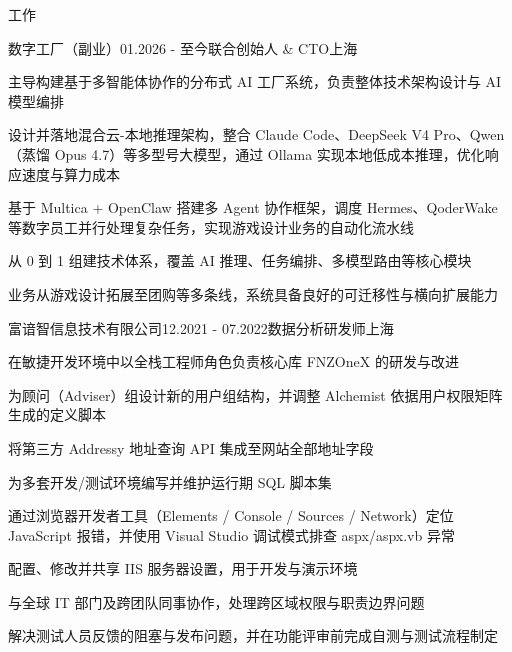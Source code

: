 \documentclass{resume} %
\begin{document}
\begin{rSection}{工作}
  \begin{rSubsection}{数字工厂（副业）}{01.2026 - 至今}{联合创始人 \& CTO}{上海}
    \item 主导构建基于多智能体协作的分布式 AI 工厂系统，负责整体技术架构设计与 AI 模型编排
    \item 设计并落地混合云-本地推理架构，整合 Claude Code、DeepSeek V4 Pro、Qwen（蒸馏 Opus 4.7）等多型号大模型，通过 Ollama 实现本地低成本推理，优化响应速度与算力成本
    \item 基于 Multica + OpenClaw 搭建多 Agent 协作框架，调度 Hermes、QoderWake 等数字员工并行处理复杂任务，实现游戏设计业务的自动化流水线
    \item 从 0 到 1 组建技术体系，覆盖 AI 推理、任务编排、多模型路由等核心模块
    \item 业务从游戏设计拓展至团购等多条线，系统具备良好的可迁移性与横向扩展能力
  \end{rSubsection}

  \begin{rSubsection}{富谙智信息技术有限公司}{12.2021 - 07.2022}{数据分析研发师}{上海}
    \item 在敏捷开发环境中以全栈工程师角色负责核心库 FNZOneX 的研发与改进
    \item 为顾问（Adviser）组设计新的用户组结构，并调整 Alchemist 依据用户权限矩阵生成的定义脚本
    \item 将第三方 Addressy 地址查询 API 集成至网站全部地址字段
    \item 为多套开发/测试环境编写并维护运行期 SQL 脚本集
    \item 通过浏览器开发者工具（Elements / Console / Sources / Network）定位 JavaScript 报错，并使用 Visual Studio 调试模式排查 aspx/aspx.vb 异常
    \item 配置、修改并共享 IIS 服务器设置，用于开发与演示环境
    \item 与全球 IT 部门及跨团队同事协作，处理跨区域权限与职责边界问题
    \item 解决测试人员反馈的阻塞与发布问题，并在功能评审前完成自测与测试流程制定
  \end{rSubsection}


\end{rSection}
\end{document}
